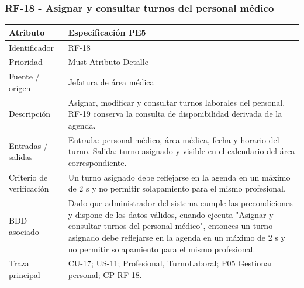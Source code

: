 \documentclass[11pt,a4paper]{article}
\begin{document}
	\subsubsection{RF-18 - Asignar y consultar turnos del personal médico}
	\begin{tabularx}{\textwidth}{p{3.2cm}Y}
		\toprule
		\textbf{Atributo} & \textbf{Especificación PE5}\\\midrule
		Identificador & RF-18\\
		Prioridad & Must Atributo Detalle\\
		Fuente / origen & Jefatura de área médica\\
		Descripción & Asignar, modificar y consultar turnos laborales del personal. RF-19 conserva la consulta de disponibilidad derivada de la agenda.\\
		Entradas / salidas & Entrada: personal médico, área médica, fecha y horario del turno. Salida: turno asignado y visible en el calendario del área correspondiente.\\
		Criterio de verificación & Un turno asignado debe reflejarse en la agenda en un máximo de 2 s y no permitir solapamiento para el mismo profesional.\\
		BDD asociado & Dado que administrador del sistema cumple las precondiciones y dispone de los datos válidos, cuando ejecuta "Asignar y consultar turnos del personal médico", entonces un turno asignado debe reflejarse en la agenda en un máximo de 2 s y no permitir solapamiento para el mismo profesional.\\
		Traza principal & CU-17; US-11; Profesional, TurnoLaboral; P05 Gestionar personal; CP-RF-18.\\
		\bottomrule
	\end{tabularx}
	\clearpage
\end{document}

